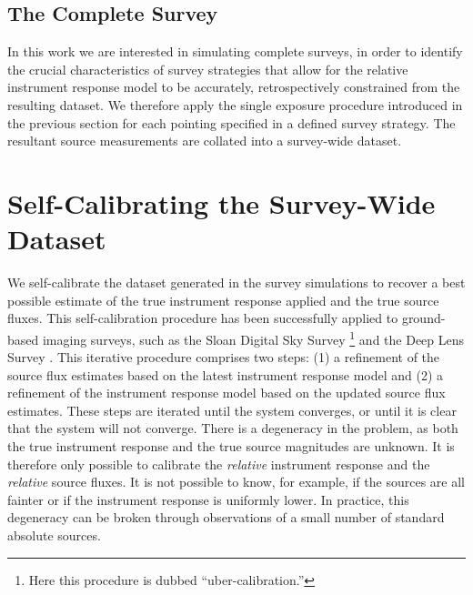 \documentclass[manuscript]{aastex}
\begin{document}
\subsection{The Complete Survey}
In this work we are interested in simulating complete surveys, in order to identify the crucial characteristics of survey strategies that allow for the relative instrument response model to be accurately, retrospectively constrained from the resulting dataset. We therefore apply the single exposure procedure introduced in the previous section for each pointing specified in a defined survey strategy. The resultant source measurements are collated into a survey-wide dataset. 

\section{Self-Calibrating the Survey-Wide Dataset}
\label{sec:self_cal}
We self-calibrate the dataset generated in the survey simulations to recover a best possible estimate of the true instrument response applied and the true source fluxes. This self-calibration procedure has been successfully applied to ground-based imaging surveys, such as the Sloan Digital Sky Survey \citep{pad08}\footnote{Here this procedure is dubbed ``uber-calibration.''} and the Deep Lens Survey \citep{wit11}. This iterative procedure comprises two steps: (1) a refinement of the source flux estimates based on the latest instrument response model and (2) a refinement of the instrument response model based on the updated source flux estimates. These steps are iterated until the system converges, or until it is clear that the system will not converge. There is a degeneracy in the problem, as both the true instrument response and the true source magnitudes are unknown. It is therefore only possible to calibrate the \textit{relative} instrument response and the \textit{relative} source fluxes. It is not possible to know, for example, if the sources are all fainter or if the instrument response is uniformly lower. In practice, this degeneracy can be broken through observations of a small number of standard absolute sources.
\end{document}
